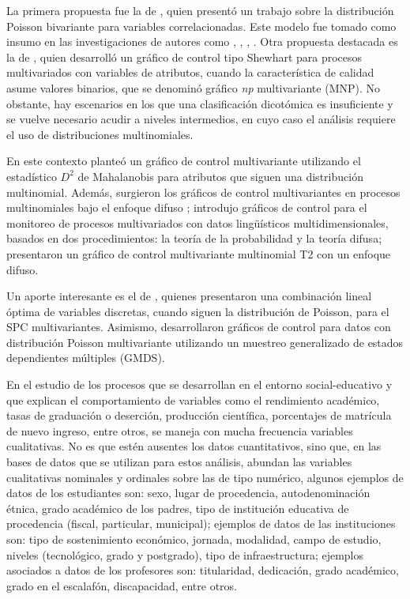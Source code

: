 \documentclass[water,article,submit,moreauthors,pdftex]{mdpi}
\begin{document}
La primera propuesta fue la de \citet{holgate1964}, quien presentó un
trabajo sobre la distribución Poisson bivariante para variables
correlacionadas. Este modelo fue tomado como insumo en las
investigaciones de autores como \citet{chiu2007}, \citet{ho2009},
\citet{laungrungrong2011ewma}, \citet{epprecht2013optimal}. Otra
propuesta destacada es la de \citet{lu1998control}, quien desarrolló un
gráfico de control tipo Shewhart para procesos multivariados con
variables de atributos, cuando la característica de calidad asume
valores binarios, que se denominó gráfico \emph{np} multivariante (MNP).
No obstante, hay escenarios en los que una clasificación dicotómica es
insuficiente y se vuelve necesario acudir a niveles intermedios, en cuyo
caso el análisis requiere el uso de distribuciones multinomiales.

En este contexto \citet{ranjan2008multivariate} planteó un gráfico de
control multivariante utilizando el estadístico \(D^2\) de Mahalanobis
para atributos que siguen una distribución multinomial. Además,
surgieron los gráficos de control multivariantes en procesos
multinomiales bajo el enfoque difuso \citep{taleb2006multivariate};
\citet{taleb2009control} introdujo gráficos de control para el monitoreo
de procesos multivariados con datos lingüísticos multidimensionales,
basados en dos procedimientos: la teoría de la probabilidad y la teoría
difusa; \citet{pastuizaca2015multivariate} presentaron un gráfico de
control multivariante multinomial T2 con un enfoque difuso.

Un aporte interesante es el de \citet{epprecht2013optimal}, quienes
presentaron una combinación lineal óptima de variables discretas, cuando
siguen la distribución de Poisson, para el SPC multivariantes. Asimismo,
\citet{raza2019design} desarrollaron gráficos de control para datos con
distribución Poisson multivariante utilizando un muestreo generalizado
de estados dependientes múltiples (GMDS).

En el estudio de los procesos que se desarrollan en el entorno
social-educativo y que explican el comportamiento de variables como el
rendimiento académico, tasas de graduación o deserción, producción
científica, porcentajes de matrícula de nuevo ingreso, entre otros, se
maneja con mucha frecuencia variables cualitativas. No es que estén
ausentes los datos cuantitativos, sino que, en las bases de datos que se
utilizan para estos análisis, abundan las variables cualitativas
nominales y ordinales sobre las de tipo numérico, algunos ejemplos de
datos de los estudiantes son: sexo, lugar de procedencia,
autodenominación étnica, grado académico de los padres, tipo de
institución educativa de procedencia (fiscal, particular, municipal);
ejemplos de datos de las instituciones son: tipo de sostenimiento
económico, jornada, modalidad, campo de estudio, niveles (tecnológico,
grado y postgrado), tipo de infraestructura; ejemplos asociados a datos
de los profesores son: titularidad, dedicación, grado académico, grado
en el escalafón, discapacidad, entre otros.
\end{document}
